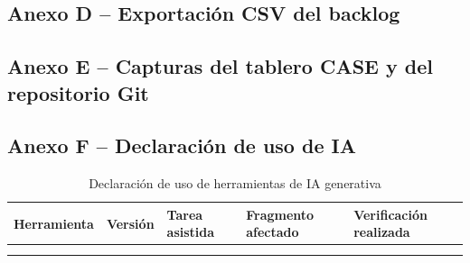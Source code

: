 \documentclass[journal,onecolumn]{IEEEtran}
\newcommand{\guia}[2]{%
	\begin{mdframed}[style=guia]
		\sloppy
		\noindent\textbf{Responsable: #1}\\[2pt]
		#2
	\end{mdframed}
}
\newif\ifguias
\let\guiaoriginal\guia
\renewcommand{\guia}[2]{\ifguias\guiaoriginal{#1}{#2}\fi}
\begin{document}
	\subsection*{Anexo D -- Exportación CSV del backlog}
	
	\guia{Jonathan (Integrante 3)}{%
		Referenciar \texttt{04\_Trazabilidad/backlog\_export.csv} e incluir captura de la
		exportación. El CSV debe estar \textbf{versionado en el repositorio} y referenciado desde
		la sección 7.}
	
	\subsection*{Anexo E -- Capturas del tablero CASE y del repositorio Git}
	
	\guia{Edson (capturas de Git) -- Jonathan (capturas del tablero)}{%
		Tablero completo, detalle de $\geq$~3 issues, panel de estadísticas,
		\texttt{git log --oneline --graph --decorate} y \texttt{git tag -n}.
		Todas las capturas con la cuenta del integrante visible (criterio~A2).}
	
	\subsection*{Anexo F -- Declaración de uso de IA}
	
	\begin{table}[H]
		\centering
		\caption{Declaración de uso de herramientas de IA generativa}
		\begin{tabular}{L{2.5cm} L{1.5cm} L{3.2cm} L{2.8cm} L{2.8cm}}
			\toprule
			\textbf{Herramienta} & \textbf{Versión} & \textbf{Tarea asistida} &
			\textbf{Fragmento afectado} & \textbf{Verificación realizada} \\
			\midrule
			& & & & \\
			& & & & \\
			\bottomrule
		\end{tabular}
	\end{table}
	
	\guia{Edson (Integrante 1)}{%
		Declaración \textbf{obligatoria}: omitirla activa el criterio de admisión~A4 y reduce la
		nota al 25\,\%. Declarar con precisión herramienta, versión, qué se pidió, qué fragmento
		quedó afectado y \textbf{cómo lo verificó el equipo}. Cerrar con las firmas de los tres
		integrantes.\\[3pt]
		Incluir también aquí la respuesta escrita del docente sobre la asignación de los cuatro
		roles de inspección en un equipo de tres.\\[3pt]
		Importante: declarar el uso \textbf{no exime} de la penalización de la escala S1--S4; ambas
		son acumulables. La protección real es que el contenido técnico (defectos, métricas, RFC,
		matriz) sea producido y verificado por el equipo sobre el ERS real.}
	
\end{document}
